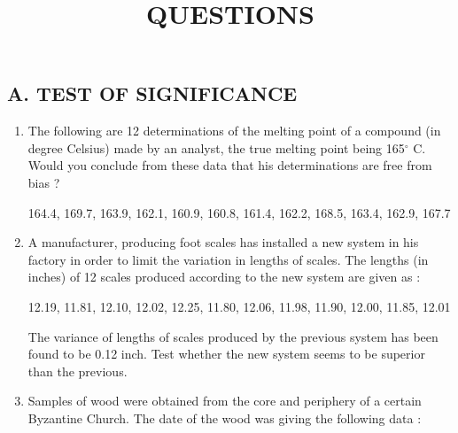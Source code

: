 \documentclass[11pt, a4paper]{article}
\title{\textbf{QUESTIONS}}
\author{}
\date{}
\begin{document}
\maketitle



\begin{center}


\section*{A. TEST OF SIGNIFICANCE}


\end{center}

\begin{enumerate}

\item The following are 12 determinations of the melting point of a compound (in degree Celsius) made by an analyst, the true melting point being 165$^\circ{}$ C. Would you conclude from these data that his determinations are free from bias ?

\begin{center}
164.4, 169.7, 163.9, 162.1, 160.9, 160.8, 161.4, 162.2, 168.5, 163.4, 162.9, 167.7
\end{center}







\item A manufacturer, producing foot scales has installed a new system in his factory in order to limit the variation in lengths of scales. The lengths (in inches) of 12 scales produced according to the new system are given as :

	\begin{center}
		12.19, 11.81, 12.10, 12.02, 12.25, 11.80, 12.06, 11.98, 11.90, 12.00, 11.85, 12.01
	\end{center}

The variance of lengths of scales produced by the previous system has been found to be 0.12 inch. Test whether the new system seems to be superior than the previous.










\item Samples of wood were obtained from the core and periphery of a certain Byzantine Church. The date of the wood was giving the following data : \\


\end{enumerate}
\end{document}
